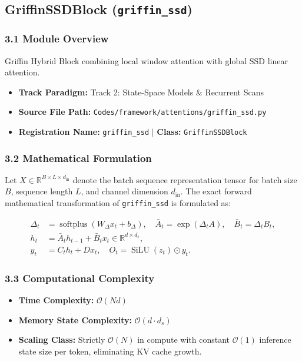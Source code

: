 \subsection{GriffinSSDBlock (\texttt{griffin\_ssd})}
\label{sec:app_module_griffin_ssd}

\subsubsection*{3.1 Module Overview}
Griffin Hybrid Block combining local window attention with global SSD linear attention.
\begin{itemize}
    \item \textbf{Track Paradigm:} Track 2: State-Space Models \& Recurrent Scans
    \item \textbf{Source File Path:} \texttt{Codes/framework/attentions/griffin\_ssd.py}
    \item \textbf{Registration Name:} \texttt{griffin\_ssd} $\mid$ \textbf{Class:} \texttt{GriffinSSDBlock}
\end{itemize}

\subsubsection*{3.2 Mathematical Formulation}
Let $X \in \mathbb{R}^{B \times L \times d_{\text{in}}}$ denote the batch sequence representation tensor for batch size $B$, sequence length $L$, and channel dimension $d_{\text{in}}$. The exact forward mathematical transformation of \texttt{griffin\_ssd} is formulated as:

\begin{align}
\Delta_t &= \operatorname{softplus}(W_\Delta x_t + b_\Delta), \quad \bar{A}_t = \exp(\Delta_t A), \quad \bar{B}_t = \Delta_t B_t, \\
h_t &= \bar{A}_t h_{t-1} + \bar{B}_t x_t \in \mathbb{R}^{d \times d_s}, \\
y_t &= C_t h_t + D x_t, \quad O_t = \operatorname{SiLU}(z_t) \odot y_t.
\end{align}


\subsubsection*{3.3 Computational Complexity}
\begin{itemize}
    \item \textbf{Time Complexity:} $\mathcal{O}(N d)$
    \item \textbf{Memory State Complexity:} $\mathcal{O}(d \cdot d_s)$
    \item \textbf{Scaling Class:} Strictly $\mathcal{O}(N)$ in compute with constant $\mathcal{O}(1)$ inference state size per token, eliminating KV cache growth.
\end{itemize}


